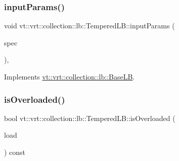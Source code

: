 \mbox{\label{structvt_1_1vrt_1_1collection_1_1lb_1_1_tempered_l_b_a12430d0bfd997324ac4343d736d0572e}} 
\subsubsection{\texorpdfstring{input\+Params()}{inputParams()}}
{\footnotesize\ttfamily void vt\+::vrt\+::collection\+::lb\+::\+Tempered\+L\+B\+::input\+Params (\begin{DoxyParamCaption}\item[{\hyperlink{structvt_1_1vrt_1_1collection_1_1balance_1_1_spec_entry}{balance\+::\+Spec\+Entry} $\ast$}]{spec }\end{DoxyParamCaption})\hspace{0.3cm}{\ttfamily [override]}, {\ttfamily [virtual]}}



Implements \hyperlink{structvt_1_1vrt_1_1collection_1_1lb_1_1_base_l_b_a555e29aadfd428383464d6dd007506b6}{vt\+::vrt\+::collection\+::lb\+::\+Base\+LB}.

\mbox{\label{structvt_1_1vrt_1_1collection_1_1lb_1_1_tempered_l_b_ab737fad35804f7a6db9ae67a7a5fa982}} 
\subsubsection{\texorpdfstring{is\+Overloaded()}{isOverloaded()}}
{\footnotesize\ttfamily bool vt\+::vrt\+::collection\+::lb\+::\+Tempered\+L\+B\+::is\+Overloaded (\begin{DoxyParamCaption}\item[{\hyperlink{structvt_1_1vrt_1_1collection_1_1lb_1_1_base_l_b_a215e22b9f12678303f49615ae3be05cc}{Load\+Type}}]{load }\end{DoxyParamCaption}) const\hspace{0.3cm}{\ttfamily [protected]}}

